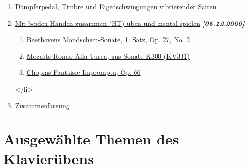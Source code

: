 \begin{enumerate}
 \item \hyperlink{c1ii24}{Dämpferpedal, Timbre und Eigenschwingungen vibrierender Saiten}
 \item \hyperlink{c1ii25}{Mit beiden Händen zusammen (HT) üben und mental spielen} \textbf{\textit{[05.12.2009]}}
  \begin{enumerate}[label={\alph*.}] 
   <li>\hyperlink{c1ii25a}{Einführung}
   \item \hyperlink{c1ii25b}{Beethovens Mondschein-Sonate, 1. Satz, Op. 27, No. 2}
   \item \hyperlink{c1ii25c}{Mozarts Rondo Alla Turca, aus Sonate K300 (KV331)}
   \item \hyperlink{c1ii25d}{Chopins Fantaisie-Impromptu, Op. 66}
   \end{enumerate}
 </li>
 \item \hyperlink{c1ii26}{Zusammenfassung}
 \end{enumerate}

\chapter{Ausgewählte Themen des Klavierübens}

